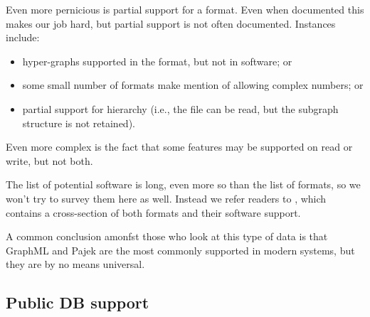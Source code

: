 \documentclass{sig-alternate}
\begin{document}
Even more pernicious is partial support for a format. Even when
documented this makes our job hard, but partial support is not often
documented. Instances include:
\begin{itemize}
\item hyper-graphs supported in the format, but not in software;  or
\item some small number of formats make mention of allowing complex
  numbers; or
\item partial support for hierarchy (i.e., the file can be read, but
  the subgraph structure is not retained).
\end{itemize}

Even more complex is the fact that some features may be supported on
read or write, but not both. 





The list of potential software is long, even more so than the list of
formats, so we won't try to survey them here as well. Instead we refer
readers to \cite{bodlaj13:_networ}, which contains a cross-section of
both formats and their software support. 

A common conclusion amonfst those who look at this type of data is
that GraphML and Pajek are the most commonly supported in modern
systems, but they are by no means universal. 

\subsection{Public DB support}
\end{document}
